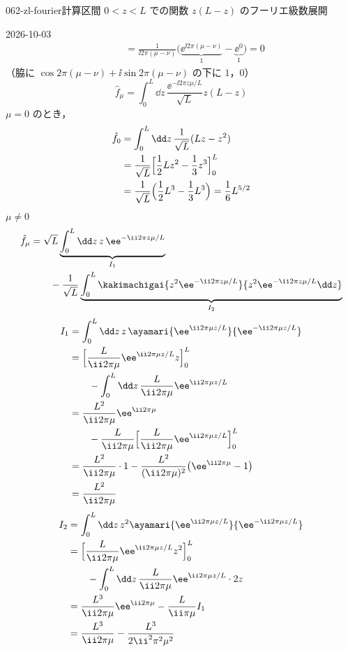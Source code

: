 \documentclass[uplatex,dvipdfmx,a4paper,11pt]{jsarticle}
\begin{document}
\begin{mondai}{062-zl-fourier}{計算}{区間 $0<z<L$ での関数 $z(L-z)$ のフーリエ級数展開}
\begin{kotaeutsushi}{2026-10-03}
\begin{align*}
  &\qquad=\frac{1}{\ii2\pi(\mu-\nu)}\bigl(\underbrace{\ee^{\ii2\pi(\mu-\nu)}}_{1}-\underbrace{\ee^{0}}_{1}\bigr)=0
\end{align*}
（脇に $\cos2\pi(\mu-\nu)+\ii\sin2\pi(\mu-\nu)$ の下に $1$，$0$）
\[
  \hat{f}_{\mu}=\int_{0}^{L}\dd z\,\frac{\ee^{-\ii2\pi z\mu/L}}{\sqrt{L}}z(L-z)
\]
$\mu=0$ のとき，
\begin{align*}
  \hat{f}_0&=\int_{0}^{L}\dd z\,\frac{1}{\sqrt{L}}(Lz-z^{2})\\
  &=\frac{1}{\sqrt{L}}\Bigl[\frac{1}{2}Lz^{2}-\frac{1}{3}z^{3}\Bigr]_{0}^{L}\\
  &=\frac{1}{\sqrt{L}}\Bigl(\frac{1}{2}L^{3}-\frac{1}{3}L^{3}\Bigr)=\frac{1}{6}L^{5/2}
\end{align*}
$\mu\neq0$
\begin{align*}
  \hat{f}_{\mu}&=\sqrt{L}\underbrace{\int_{0}^{L}\dd z\,z\,\ee^{-\ii2\pi z\mu/L}}_{I_1}\\
  &\qquad-\frac{1}{\sqrt{L}}\underbrace{\int_{0}^{L}\kakimachigai{z^{2}\ee^{-\ii2\pi z\mu/L}}{z^{2}\ee^{-\ii2\pi z\mu/L}\dd z}}_{I_2}
\end{align*}
\begin{align*}
  I_1&=\int_{0}^{L}\dd z\,z\,\ayamari{\ee^{\ii2\pi\mu z/L}}{\ee^{-\ii2\pi\mu z/L}}\\
  &=\Bigl[\frac{L}{\ii2\pi\mu}\ee^{\ii2\pi\mu z/L}z\Bigr]_{0}^{L}\\
  &\qquad-\int_{0}^{L}\dd z\,\frac{L}{\ii2\pi\mu}\ee^{\ii2\pi\mu z/L}\\
  &=\frac{L^{2}}{\ii2\pi\mu}\ee^{\ii2\pi\mu}\\
  &\qquad-\frac{L}{\ii2\pi\mu}\Bigl[\frac{L}{\ii2\pi\mu}\ee^{\ii2\pi\mu z/L}\Bigr]_{0}^{L}\\
  &=\frac{L^{2}}{\ii2\pi\mu}\cdot1-\frac{L^{2}}{(\ii2\pi\mu)^{2}}\bigl(\ee^{\ii2\pi\mu}-1\bigr)\\
  &=\frac{L^{2}}{\ii2\pi\mu}
\end{align*}
\begin{align*}
  I_2&=\int_{0}^{L}\dd z\,z^{2}\ayamari{\ee^{\ii2\pi\mu z/L}}{\ee^{-\ii2\pi\mu z/L}}\\
  &=\Bigl[\frac{L}{\ii2\pi\mu}\ee^{\ii2\pi\mu z/L}z^{2}\Bigr]_{0}^{L}\\
  &\qquad-\int_{0}^{L}\dd z\,\frac{L}{\ii2\pi\mu}\ee^{\ii2\pi\mu z/L}\cdot2z\\
  &=\frac{L^{3}}{\ii2\pi\mu}\ee^{\ii2\pi\mu}-\frac{L}{\ii\pi\mu}I_1\\
  &=\frac{L^{3}}{\ii2\pi\mu}-\frac{L^{3}}{2\ii^{2}\pi^{2}\mu^{2}}
\end{align*}

\end{kotaeutsushi}
\end{mondai}
\end{document}
